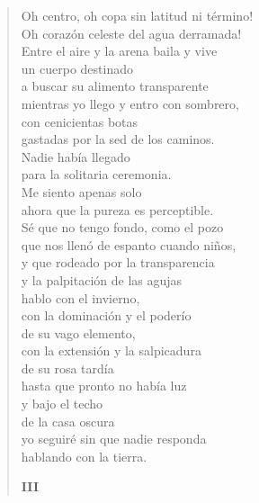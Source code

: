 \documentclass[12pt]{article}
\begin{document}
\begin{verse}
Oh centro, oh copa sin latitud ni término!\\
Oh corazón celeste del agua derramada!\\
Entre el aire y la arena baila y vive\\
un cuerpo destinado\\
a buscar su alimento transparente\\
mientras yo llego y entro con sombrero,\\
con cenicientas botas\\
gastadas por la sed de los caminos.\\
Nadie había llegado\\
para la solitaria ceremonia.\\
Me siento apenas solo\\
ahora que la pureza es perceptible.\\
Sé que no tengo fondo, como el pozo\\
que nos llenó de espanto cuando niños,\\
y que rodeado por la transparencia\\
y la palpitación de las agujas\\
hablo con el invierno,\\
con la dominación y el poderío\\
de su vago elemento,\\
con la extensión y la salpicadura\\
de su rosa tardía\\
hasta que pronto no había luz\\
y bajo el techo\\
de la casa oscura\\
yo seguiré sin que nadie responda\\
hablando con la tierra.  

{\bfseries\scshape {III}}


\end{verse}
\end{document}
